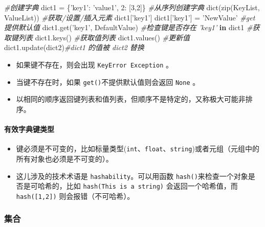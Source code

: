 \documentclass[]{article}
\newenvironment{Shaded}{}{}
\newcommand{\KeywordTok}[1]{\textcolor[rgb]{0.00,0.44,0.13}{\textbf{#1}}}
\newcommand{\DecValTok}[1]{\textcolor[rgb]{0.25,0.63,0.44}{#1}}
\newcommand{\StringTok}[1]{\textcolor[rgb]{0.25,0.44,0.63}{#1}}
\newcommand{\CommentTok}[1]{\textcolor[rgb]{0.38,0.63,0.69}{\textit{#1}}}
\newcommand{\OperatorTok}[1]{\textcolor[rgb]{0.40,0.40,0.40}{#1}}
\newcommand{\BuiltInTok}[1]{#1}
\newcommand{\NormalTok}[1]{#1}
\let\oldparagraph\paragraph
\renewcommand{\paragraph}[1]{\oldparagraph{#1}\mbox{}}
\begin{document}
\begin{Shaded}
\begin{Highlighting}[]
\CommentTok{#创建字典}
\NormalTok{dict1 }\OperatorTok{=}\NormalTok{ \{}\StringTok{'key1'}\NormalTok{: }\StringTok{'value1'}\NormalTok{, }\DecValTok{2}\NormalTok{: [}\DecValTok{3}\NormalTok{,}\DecValTok{2}\NormalTok{]\}}
\CommentTok{#从序列创建字典}
\BuiltInTok{dict}\NormalTok{(}\BuiltInTok{zip}\NormalTok{(KeyList, ValueList))}
\CommentTok{#获取/设置/插入元素}
\NormalTok{dict1[}\StringTok{'key1'}\NormalTok{]}
\NormalTok{dict1[}\StringTok{'key1'}\NormalTok{] }\OperatorTok{=} \StringTok{'NewValue'}
\CommentTok{#get 提供默认值}
\NormalTok{dict1.get(}\StringTok{'key1'}\NormalTok{, DefaultValue)}
\CommentTok{#检查键是否存在}
\CommentTok{'key1'} \KeywordTok{in}\NormalTok{ dict1}
\CommentTok{#获取键列表}
\NormalTok{dict1.keys()}
\CommentTok{#获取值列表}
\NormalTok{dict1.values()}
\CommentTok{#更新值}
\NormalTok{dict1.update(dict2)}\CommentTok{#dict1 的值被 dict2 替换}
\end{Highlighting}
\end{Shaded}

\begin{itemize}
\item
  如果键不存在，则会出现 \texttt{KeyError\ Exception} 。
\item
  当键不存在时，如果 \texttt{get()}不提供默认值则会返回 \texttt{None} 。
\item
  以相同的顺序返回键列表和值列表，但顺序不是特定的，又称极大可能非排序。
\end{itemize}

\paragraph{有效字典键类型}\label{header-n186}

\begin{itemize}
\item
  键必须是不可变的，比如标量类型(\texttt{int}、\texttt{float}、\texttt{string})或者元组（元组中的所有对象也必须是不可变的）。
\item
  这儿涉及的技术术语是 \texttt{hashability}。可以用函数
  \texttt{hash()}来检查一个对象是否是可哈希的，比如
  \texttt{hash(\textquotesingle{}This\ is\ a\ string\textquotesingle{})}
  会返回一个哈希值，而 \texttt{hash({[}1,2{]})} 则会报错（不可哈希）。
\end{itemize}

\subsubsection{集合}\label{header-n194}
\end{document}
